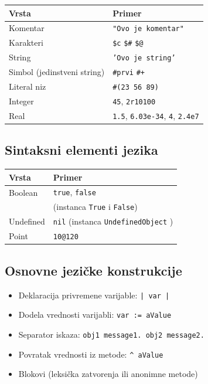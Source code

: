 \documentclass[presentation]{beamer}
\begin{document}
\begin{center}
\begin{tabular}{ll}
Vrsta & Primer\\
\hline
Komentar & \texttt{"Ovo je komentar"}\\
Karakteri & \texttt{\$c} \texttt{\$\#} \texttt{\$@}\\
String & \texttt{'Ovo je string'}\\
Simbol (jedinstveni string) & \texttt{\#prvi} \texttt{\#+}\\
Literal niz & \texttt{\#(23 56 89)}\\
Integer & \texttt{45}, \texttt{2r10100}\\
Real & \texttt{1.5}, \texttt{6.03e-34}, \texttt{4}, \texttt{2.4e7}\\
\end{tabular}
\end{center}

\subsection{Sintaksni elementi jezika}
\label{sec:org159d97a}

\begin{center}
\begin{tabular}{ll}
Vrsta & Primer\\
\hline
Boolean & \texttt{true}, \texttt{false}\\
 & (instanca \texttt{True} i \texttt{False})\\
Undefined & \texttt{nil} (instanca \texttt{UndefinedObject} )\\
Point & \texttt{10@120}\\
\end{tabular}
\end{center}

\subsection{Osnovne jezičke konstrukcije}
\label{sec:orga8eb8b9}

\begin{itemize}
\item Deklaracija privremene varijable: \texttt{| var |}
\item Dodela vrednosti varijabli: \texttt{var := aValue}
\item Separator iskaza: \texttt{obj1 message1. obj2 message2.}
\item Povratak vrednosti iz metode: \texttt{\textasciicircum{} aValue}
\item Blokovi (leksička zatvorenja ili anonimne metode)
\end{itemize}
\end{document}
